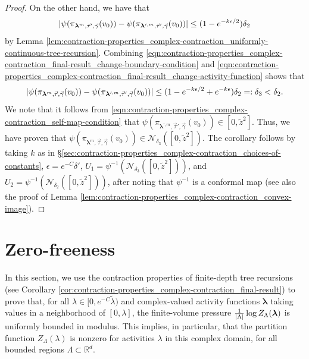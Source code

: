 \documentclass[11pt]{article}
\newcommand{\R}{\mathbb R}
\newcommand{\bl}{\bm{\lambda}}
\newcommand{\tl}{\tilde{\lambda}}
\newcommand{\tz}{\tilde{z}}
\newcommand{\lsconst}{C}
\numberwithin{equation}{section}
\theoremstyle{plain}
\theoremstyle{definition}
\theoremstyle{remark}
\begin{document}
\begin{proof}
On the other hand, we have that
\begin{equation}
\label{eqn:contraction-properties_complex-contraction_final-result_change-activity-function}
\abs{\psi(\pi_{\bl^{m},\vec{\tau}',\vec{\gamma}}(v_{0}))-\psi(\pi_{\bl^{\prime,m},\vec{\tau}',\vec{\gamma}}(v_{0}))}\le(1-e^{-k\epsilon/2})\delta_{2}
\end{equation}
by Lemma \ref{lem:contraction-properties_complex-contraction_uniformly-continuous-tree-recursion}.
Combining \eqref{eqn:contraction-properties_complex-contraction_final-result_change-boundary-condition} and \eqref{eqn:contraction-properties_complex-contraction_final-result_change-activity-function} shows that
\begin{equation}
\abs{\psi(\pi_{\bl^{m},\vec{\tau},\vec{\gamma}}(v_{0}))
-\psi(\pi_{\bl^{\prime,m},\vec{\tau}',\vec{\gamma}}(v_{0}))}
\le(1-e^{-k\epsilon/2}+e^{-k\epsilon})\delta_{2}=:\delta_{3}<\delta_{2}.
\end{equation}
We note that it follows from \eqref{eqn:contraction-properties_complex-contraction_self-map-condition} that $\psi(\pi_{\bl^{\prime,m},\vec{\tau}',\vec{\gamma}}(v_{0}))\in[0,\tz^{2}]$.
Thus, we have proven
that $\psi(\pi_{\bl^{m},\vec{\tau},\vec{\gamma}}(v_{0}))\in\mathcal{N}_{\delta_{3}}([0,\tz^{2}])$.
The corollary follows by taking $k$ as in \S\ref{sec:contraction-properties_complex-contraction_choices-of-constants}, $\epsilon=e^{-\lsconst}\delta'$, $U_{1}=\psi^{-1}(\mathcal{N}_{\delta_{3}}([0,\tz^{2}]))$, and $U_{2}=\psi^{-1}(\mathcal{N}_{\delta_{2}}([0,\tz^{2}]))$, after noting that $\psi^{-1}$ is a conformal map (see also the proof of Lemma \ref{lem:contraction-properties_complex-contraction_convex-image}).
\end{proof}



\section{Zero-freeness}
\label{sec:zero-freeness}

In this section, we use the contraction properties of finite-depth tree recursions (see Corollary \ref{cor:contraction-properties_complex-contraction_final-result}) to prove that, for all $\lambda\in[0,e^{-\lsconst}\tl)$ and complex-valued activity functions $\bl$ taking values in a neighborhood of $[0,\lambda]$, the finite-volume pressure $\frac{1}{\abs{\Lambda}}\log Z_{\Lambda}(\bl)$ is uniformly bounded in modulus.
This implies, in particular, that the partition function $Z_{\Lambda}(\lambda)$ is nonzero for activities $\lambda$ in this complex domain, for all bounded regions $\Lambda\subset\R^{d}$.
\end{document}

